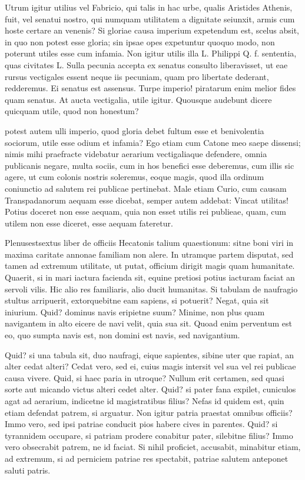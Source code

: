  Utrum igitur utilius vel Fabricio, qui talis in hac urbe, qualis Aristides Athenis, fuit, vel senatui nostro, qui numquam utilitatem a dignitate seiunxit, armis cum hoste certare an venenis? Si gloriae causa imperium expetendum est, scelus absit, in quo non potest esse gloria; sin ipsae opes expetuntur quoquo modo, non poterunt utiles esse cum infamia. Non igitur utilis illa L. Philippi Q. f. sententia, quas civitates L. Sulla pecunia accepta ex senatus consulto liberavisset, ut eae rursus vectigales essent neque iis pecuniam, quam pro libertate dederant, redderemus. Ei senatus est assensus. Turpe imperio! piratarum enim melior fides quam senatus. At aucta vectigalia, utile igitur. Quousque audebunt dicere quicquam utile, quod non honestum?

 potest autem ulli imperio, quod gloria debet fultum esse et benivolentia sociorum, utile esse odium et infamia? Ego etiam cum Catone meo saepe dissensi; nimis mihi praefracte videbatur aerarium vectigaliaque defendere, omnia publicanis negare, multa sociis, cum in hos benefici esse deberemus, cum illis sic agere, ut cum colonis nostris soleremus, eoque magis, quod illa ordinum coniunctio ad salutem rei publicae pertinebat. Male etiam Curio, cum causam Transpadanorum aequam esse dicebat, semper autem addebat: Vincat utilitas! Potius doceret non esse aequam, quia non esset utilis rei publieae, quam, cum utilem non esse diceret, esse aequam fateretur.

 Plenusestsextus liber de officiis Hecatonis talium quaestionum: sitne boni viri in maxima caritate annonae familiam non alere. In utramque partem disputat, sed tamen ad extremum utilitate, ut putat, officium dirigit magis quam humanitate. Quaerit, si in mari iactura facienda sit, equine pretiosi potius iacturam faciat an servoli vilis. Hic alio res familiaris, alio ducit humanitas. Si tabulam de naufragio stultus arripuerit, extorquebitne eam sapiens, si potuerit? Negat, quia sit iniurium. Quid? dominus navis eripietne suum? Minime, non plus quam navigantem in alto eicere de navi velit, quia sua sit. Quoad enim perventum est eo, quo sumpta navis est, non domini est navis, sed navigantium.

 Quid? si una tabula sit, duo naufragi, eique sapientes, sibine uter que rapiat, an alter cedat alteri? Cedat vero, sed ei, cuius magis intersit vel sua vel rei publicae causa vivere. Quid, si haec paria in utroque? Nullum erit certamen, sed quasi sorte aut micando victus alteri cedet alter. Quid? si pater fana expilet, cuniculos agat ad aerarium, indicetne id magistratibus filius? Nefas id quidem est, quin etiam defendat patrem, si arguatur. Non igitur patria praestat omnibus officiis? Immo vero, sed ipsi patriae conducit pios habere cives in parentes. Quid? si tyrannidem occupare, si patriam prodere conabitur pater, silebitne filius? Immo vero obsecrabit patrem, ne id faciat. Si nihil proficiet, accusabit, minabitur etiam, ad extremum, si ad perniciem patriae res spectabit, patriae salutem anteponet saluti patris.

